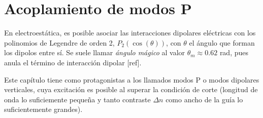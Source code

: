 \chapter{Acoplamiento de modos P}
En electroestática, es posible asociar las interacciones dipolares eléctricas con los polinomios de Legendre de orden 2, $P_2(\cos(\theta))$, con $\theta$ el ángulo que forman los dipolos entre sí. Se suele llamar \textit{ángulo mágico} al valor $\theta_m \approx 0.62$ rad, pues anula el término de interacción dipolar [ref]. 

Este capítulo tiene como protagonistas a los llamados modos P o modos dipolares verticales, cuya excitación es posible al superar la condición de corte (longitud de onda lo suficiemente pequeña y tanto contraste $\Delta n$ como ancho de la guía lo suficientemente grandes). 



